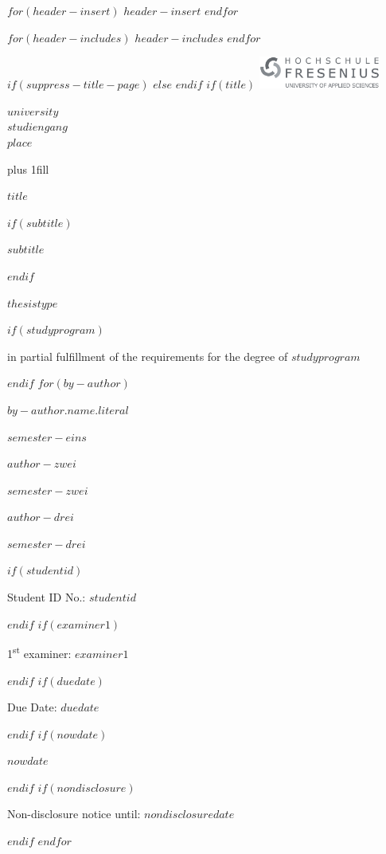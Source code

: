 

$for(header-insert)$
$header-insert$
$endfor$

$for(header-includes)$
$header-includes$
$endfor$

\makeatletter
\xpatchcmd{\appendix}
  {\par}
  {\par}
  {}{}
\makeatother



$if(suppress-title-page)$
$else$
  \frontmatter
$endif$
  $if(title)$
  \cleardoublepage
\thispagestyle{empty}
\hfill \includegraphics[width=4cm]{logo.png}\\
{\centering
  {$university$\\
$studiengang$\\
 $place$  \par
}
  \hbox{}\vskip 0cm plus 1fill
  {\Large \bfseries $title$ \par}
  $if(subtitle)$
  {\large \bfseries $subtitle$ \par}
  $endif$
  \vspace{8ex}
  {$thesistype$ \par}
  $if(studyprogram)$
  {in partial fulfillment of the requirements for the degree of $studyprogram$ \par}
  $endif$
    \vfill
  $for(by-author)$
    {$by-author.name.literal$ \par}
      \vspace{0ex}
  {$semester-eins$ \par}
  \vspace{0ex}
    {\large $author-zwei$ \par}
  \vspace{0ex}
  {$semester-zwei$ \par}
    \vspace{0ex}
    {\large $author-drei$ \par}
  \vspace{0ex}
  {$semester-drei$ \par}
  $if(studentid)$
  {Student ID No.: $studentid$ \par}
  $endif$
  $if(examiner1)$
  \vspace{8ex}
  {1\textsuperscript{st} examiner: $examiner1$ \par}
  $endif$
  \vfill
  $if(duedate)$
  {Due Date: $duedate$ \par}
  $endif$
  $if(nowdate)$
  {$nowdate$ \par}
  $endif$
    $if(nondisclosure)$
  {Non-disclosure notice until: $nondisclosuredate$ \par}
  $endif$
  $endfor$%
  \clearpage
}

